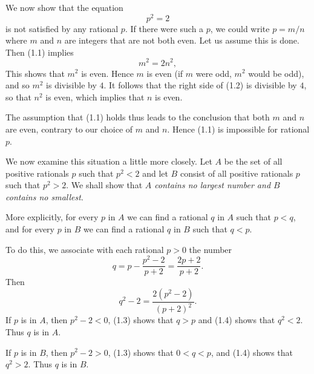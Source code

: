 \documentclass[11pt,twoside]{article}
\begin{document}
We now show that the equation
\begin{equation}
  p^2 = 2 \tag{1.1}
\end{equation}
is not satisfied by any rational $p$. If there were such a $p$, we could write
$p = m/n$ where $m$ and $n$ are integers that are not both even. Let us assume this is done. Then (1.1) implies
\begin{equation}
  m^2 = 2n^2, \tag{1.2}
\end{equation}
This shows that $m^2$ is even. Hence $m$ is even (if $m$ were odd, $m^2$ would
be odd), and so $m^2$ is divisible by $4$. It follows that the right side of
(1.2) is divisible by $4$, so that $n^2$ is even, which implies that $n$ is
even.

The assumption that (1.1) holds thus leads to the conclusion that both $m$ and
$n$ are even, contrary to our choice of $m$ and $n$. Hence (1.1) is impossible
for rational $p$.

We now examine this situation a little more closely. Let $A$ be the set of all
positive rationals $p$ such that $p^2 < 2$ and let $B$ consist of all positive
rationals $p$ such that $p^2 > 2$. We shall show that \emph{$A$ contains no
largest number and $B$ contains no smallest}.

More explicitly, for every $p$ in $A$ we can find a rational $q$ in $A$ such
that $p < q$, and for every $p$ in $B$ we can find a rational $q$ in $B$ such
that $q < p$.

To do this, we associate with each rational $p > 0$ the number
\begin{equation}
  q = p - \frac{p^2-2}{p+2} = \frac{2p+2}{p+2}. \tag{1.3}
\end{equation}
Then
\begin{equation}
  q^2 - 2 = \frac{2(p^2-2)}{(p+2)^2}. \tag{1.4}
\end{equation}
If $p$ is in $A$, then $p^2 - 2 < 0$, (1.3) shows that $q > p$ and (1.4) shows
that $q^2 < 2$. Thus $q$ is in $A$.

If $p$ is in $B$, then $p^2 - 2 > 0$, (1.3) shows that $0 < q < p$, and (1.4)
shows that $q^2 > 2$. Thus $q$ is in $B$.
\end{document}
